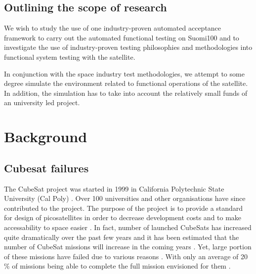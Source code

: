 \documentclass[english,12pt,a4paper,pdftex,elec,utf8]{aaltothesis}
\begin{document}
\subsection{Outlining the scope of research}
We wish to study the use of one industry-proven automated acceptance framework to carry out the automated functional testing on Suomi100 and to investigate the use of industry-proven testing philosophies and methodologies into functional system testing with the satellite.\par
In conjunction with the space industry test methodologies, we attempt to some degree simulate the environment related to functional operations of the satellite. In addition, the simulation has to take into account the relatively small funds of an university led project.\par




\clearpage

\section{Background}
\subsection{Cubesat failures}
The CubeSat project was started in 1999 in California Polytechnic State University (Cal Poly) \cite{cds}. Over 100 universities and other organisations have since contributed to the project. The purpose of the project is to provide a standard for design of picosatellites in order to decrease development costs and to make accessability to space easier \cite{cds}. In fact, number of launched CubeSats has increased quite dramatically over the past few years \cite{Swart2016} and it has been estimated that the number of CubeSat missions will increase in the coming years \cite{SpaceWorks2017}. Yet, large portion of these missions have failed due to various reasons \cite{Swart1, Swart2016, Swart2015}. With only an average of 20 \% of missions being able to complete the full mission envisioned for them \cite{Swart2016}. \par 
\end{document}
